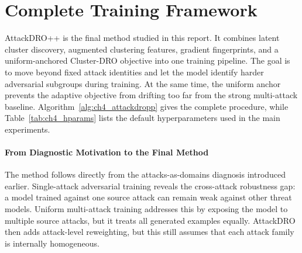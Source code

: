 \section{Complete Training Framework}
\label{sec:ch4_complete_pipeline}

AttackDRO++ is the final method studied in this report. It combines latent
cluster discovery, augmented clustering features, gradient fingerprints, and a
uniform-anchored Cluster-DRO objective into one training pipeline. The goal is to
move beyond fixed attack identities and let the model identify harder adversarial
subgroups during training. At the same time, the uniform anchor prevents the
adaptive objective from drifting too far from the strong multi-attack baseline.
Algorithm~\ref{alg:ch4_attackdropp} gives the complete procedure, while
Table~\ref{tab:ch4_hparams} lists the default hyperparameters used in the main
experiments.

\paragraph{From Diagnostic Motivation to the Final Method}

The method follows directly from the attacks-as-domains diagnosis introduced
earlier. Single-attack adversarial training reveals the cross-attack robustness
gap: a model trained against one source attack can remain weak against other
threat models. Uniform multi-attack training addresses this by exposing the model
to multiple source attacks, but it treats all generated examples equally.
AttackDRO then adds attack-level reweighting, but this still assumes that each
attack family is internally homogeneous.

